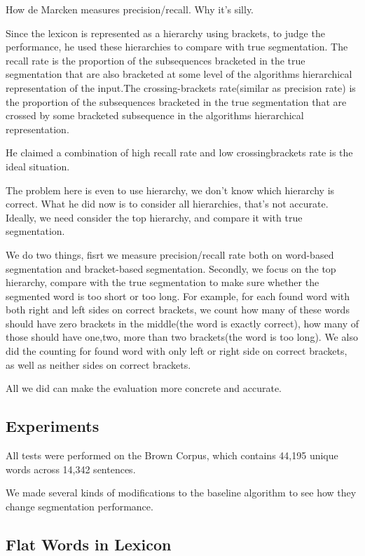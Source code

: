 \documentclass[11pt, oneside, fleqn]{article}
\begin{document}
	How de Marcken measures precision/recall. Why it's silly.
    
    Since the lexicon is represented as a hierarchy using brackets, to judge the performance, he used these hierarchies to compare with true segmentation. The recall rate is the proportion of the subsequences bracketed in the true segmentation that are also bracketed at some level of the algorithms hierarchical representation of the input.The crossing-brackets rate(similar as precision rate) is the proportion of the subsequences bracketed in the true segmentation that are crossed by some bracketed subsequence in the algorithms hierarchical representation. 
    
    He claimed a combination of high recall rate and low crossingbrackets rate is the ideal situation. 

	The problem here is even to use hierarchy, we don't know which hierarchy is correct. What he did now is to consider all hierarchies, that's not accurate. Ideally, we need consider the top hierarchy, and compare it with true segmentation.  

    We do two things, fisrt we measure precision/recall rate both on word-based segmentation and bracket-based segmentation. Secondly, we focus on the top hierarchy, compare with the true segmentation to make sure whether the segmented word is too short or too long. For example, for each found word with both right and left sides on correct brackets, we count how many of these words should have zero brackets in the middle(the word is exactly correct), how many of those should have one,two, more than two brackets(the word is too long). We also did the counting for found word with only left or right side on correct brackets, as well as neither sides on correct brackets.

    All we did can make the evaluation more concrete and accurate. 

  \subsection*{Experiments}
  
  All tests were performed on the Brown Corpus, which contains 44,195 unique words across 14,342 sentences. 
  
  We made several kinds of modifications to the baseline algorithm to see how they change segmentation performance.

  \subsection*{Flat Words in Lexicon}
  
\end{document}
